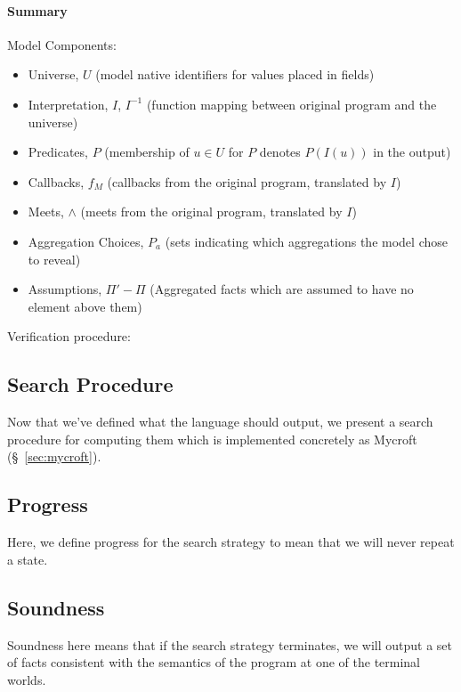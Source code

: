 \paragraph{Summary}

Model Components:
\begin{itemize}
	\item Universe, $U$ (model native identifiers for values placed in fields)
	\item Interpretation, $I$, $I^{-1}$ (function mapping between original program and the universe)
	\item Predicates, $P$ (membership of $u \in U$ for $P$ denotes $P(I(u))$ in the output)
	\item Callbacks, $f_M$ (callbacks from the original program, translated by $I$)
	\item Meets, $\wedge$ (meets from the original program, translated by $I$)
	\item Aggregation Choices, $P_a$ (sets indicating which aggregations the model chose to reveal)
	\item Assumptions, $\Pi' - \Pi$ (Aggregated facts which are assumed to have no element above them)
\end{itemize}
Verification procedure:

\subsection{Search Procedure}
\label{sec:search}
Now that we've defined what the language should output, we present a search procedure for computing them which is implemented concretely as Mycroft (\S~\ref{sec:mycroft}).
\subsection{Progress}
\label{sec:progress}
Here, we define progress for the search strategy to mean that we will never repeat a state.
\subsection{Soundness}
\label{sec:soundness}
Soundness here means that if the search strategy terminates, we will output a set of facts consistent with the semantics of the program at one of the terminal worlds.
